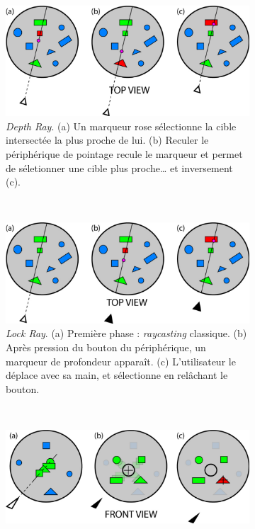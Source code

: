 	\newcommand{\rayWidth}{0.48\textwidth}
	\begin{figure}[htbp]
		\begin{subfigure}[t]{\rayWidth}
			\centering
			\includegraphics[width=\textwidth]{figures/ch2/depthRay}
			\caption{\emph{Depth Ray}. (a) Un marqueur rose sélectionne la cible intersectée la plus proche de lui. (b) Reculer le périphérique de pointage recule le marqueur et permet de séletionner une cible plus proche\ldots{} et inversement (c).}
			\label{fig:depthRay}
		\end{subfigure}
		~
		\begin{subfigure}[t]{\rayWidth}
			\centering
			\includegraphics[width=\textwidth]{figures/ch2/lockRay}
			\caption{\emph{Lock Ray}. (a) Première phase : \emph{raycasting} classique. (b) Après pression du bouton du périphérique, un marqueur de profondeur apparaît. (c) L'utilisateur le déplace avec sa main, et sélectionne en relâchant le bouton.}
			\label{fig:lockRay}
		\end{subfigure}
		~
		\begin{subfigure}[t]{\rayWidth}
			\centering
			\includegraphics[width=\textwidth]{figures/ch2/flowerRay}

\end{subfigure}
\end{figure}
